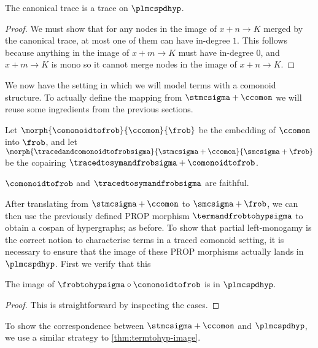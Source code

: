 \begin{proposition}
    The canonical trace is a trace on \(\plmcspdhyp\).
\end{proposition}
\begin{proof}
    We must show that for any nodes in the image
    of \(x + n \to K\) merged by the canonical trace, at most one of them can
    have in-degree \(1\).
    This follows because anything in the image of
    \(x + m \to K\) must have in-degree \(0\), and \(x + m \to K\) is
    mono so it cannot merge nodes in the image of \(x + n \to K\).
\end{proof}

We now have the setting in which we will model terms with a comonoid structure.
To actually define the mapping from \(\stmcsigma + \ccomon\) we will reuse
some ingredients from the previous sections.

\begin{definition}
    Let \(
    \morph{
        \comonoidtofrob
    }{
        \ccomon
    }{
        \frob
    }
    \) be the embedding of \(\ccomon\) into \(\frob\), and let \(
    \morph{
        \tracedandcomonoidtofrobsigma
    }{
        \stmcsigma + \ccomon
    }{
        \smcsigma + \frob
    }
    \) be the copairing \(\tracedtosymandfrobsigma + \comonoidtofrob\).
\end{definition}

\begin{corollary}
    \(\comonoidtofrob\) and \(\tracedtosymandfrobsigma\) are faithful.
\end{corollary}

After translating from \(\stmcsigma + \ccomon\) to \(\smcsigma + \frob\),
we can then use the previously defined PROP morphism \(\termandfrobtohypsigma\)
to obtain a cospan of hypergraphs; as before.
To show that partial left-monogamy is the correct notion to characterise terms
in a traced comonoid setting, it is necessary to ensure that the image of these
PROP morphisms actually lands in \(\plmcspdhyp\).
First we verify that this

\begin{lemma}
    The image of \(\frobtohypsigma \circ \comonoidtofrob\) is in
    \(\plmcspdhyp\).
\end{lemma}
\begin{proof}
    This is straightforward by inspecting the cases.
\end{proof}

To show the correspondence between \(\stmcsigma + \ccomon\) and
\(\plmcspdhyp\), we use a similar strategy to \cref{thm:termtohyp-image}.

